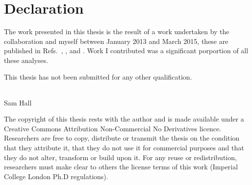 \clearpage
\chapter*{\centering Declaration}

\begin{center}
  \begin{minipage}{0.8\textwidth}
    The work presented in this thesis is the result of a work undertaken by the
    \lhcb collaboration and myself between January 2013 and March 2015, these are
    published in Refs.~\cite{Aaij:2012zh}, \cite{Aaij:2014kwa}, and \cite{DB}.
    Work I contributed was a significant porportion of all these analyses.

    This thesis has not been submitted for any other qualification.
    \\\\
    \begin{flushright}
      Sam Hall\\
      \shortdate
    \end{flushright}
  \end{minipage}

    \vfill

  \begin{minipage}{0.8\textwidth}
    \footnotesize
    The copyright of this thesis rests with the author and is made available under a Creative
    Commons Attribution Non-Commercial No Derivatives licence. Researchers are free to copy,
    distribute or transmit the thesis on the condition that they attribute it, that they do not use
    it for commercial purposes and that they do not alter, transform or build upon it. For any
    reuse or redistribution, researchers must make clear to others the license terms of this work
    (Imperial College London Ph.D regulations).
  \end{minipage}
  \vspace{0.5cm}
\end{center}
